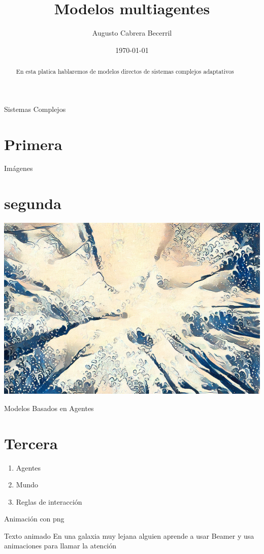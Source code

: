 \documentclass[final]{beamer}
\title{Modelos multiagentes}
\author{Augusto Cabrera Becerril}
\date{\today}
\institute{Facultad de Ciencias UNAM}
\begin{document}
\begin{frame}
\maketitle
\end{frame}

\begin{frame}{Sistemas Complejos}
\section{Primera}
    \begin{abstract}
    En esta platica  hablaremos de modelos directos de sistemas complejos adaptativos   
    \end{abstract}
    
\end{frame}

\begin{frame}{Imágenes}
\section{segunda}
\includegraphics[width=\textwidth]{imagen1.jpg}
\end{frame}

\begin{frame}{Modelos Basados en Agentes}
\section{Tercera}
\pause
    \begin{enumerate}
        \item Agentes
        \pause
        \item Mundo
        \pause
        \item Reglas de interacción
    \end{enumerate}
\end{frame}

\begin{frame}{Animación con png}
\end{frame}

\begin{frame}{Texto animado}
    En una galaxia muy lejana \pause
    alguien aprende a usar Beamer \pause
    y usa animaciones para llamar la atención
\end{frame}
\end{document}
